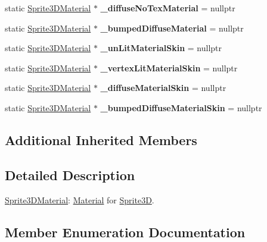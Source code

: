 \begin{DoxyCompactItemize}
static \hyperlink{classSprite3DMaterial}{Sprite3\+D\+Material} $\ast$ {\bfseries \+\_\+diffuse\+No\+Tex\+Material} = nullptr
\item 
\mbox{\label{classSprite3DMaterial_a71cdf2de668e61485ee253883f787809}} 
static \hyperlink{classSprite3DMaterial}{Sprite3\+D\+Material} $\ast$ {\bfseries \+\_\+bumped\+Diffuse\+Material} = nullptr
\item 
\mbox{\label{classSprite3DMaterial_ae3788825d826caa0eb75772749761c41}} 
static \hyperlink{classSprite3DMaterial}{Sprite3\+D\+Material} $\ast$ {\bfseries \+\_\+un\+Lit\+Material\+Skin} = nullptr
\item 
\mbox{\label{classSprite3DMaterial_a48c3c2b0bac1aa4f3425a24b001a8134}} 
static \hyperlink{classSprite3DMaterial}{Sprite3\+D\+Material} $\ast$ {\bfseries \+\_\+vertex\+Lit\+Material\+Skin} = nullptr
\item 
\mbox{\label{classSprite3DMaterial_a801501385a50440fd892129592a2659b}} 
static \hyperlink{classSprite3DMaterial}{Sprite3\+D\+Material} $\ast$ {\bfseries \+\_\+diffuse\+Material\+Skin} = nullptr
\item 
\mbox{\label{classSprite3DMaterial_a6ff13d92b8c781eb81fc87985468a96e}} 
static \hyperlink{classSprite3DMaterial}{Sprite3\+D\+Material} $\ast$ {\bfseries \+\_\+bumped\+Diffuse\+Material\+Skin} = nullptr
\end{DoxyCompactItemize}
\subsection*{Additional Inherited Members}


\subsection{Detailed Description}
\hyperlink{classSprite3DMaterial}{Sprite3\+D\+Material}\+: \hyperlink{classMaterial}{Material} for \hyperlink{classSprite3D}{Sprite3D}. 

\subsection{Member Enumeration Documentation}
\mbox{\label{classSprite3DMaterial_a2b3cb11be78a5f6332cc01d5b7063e32}} 

